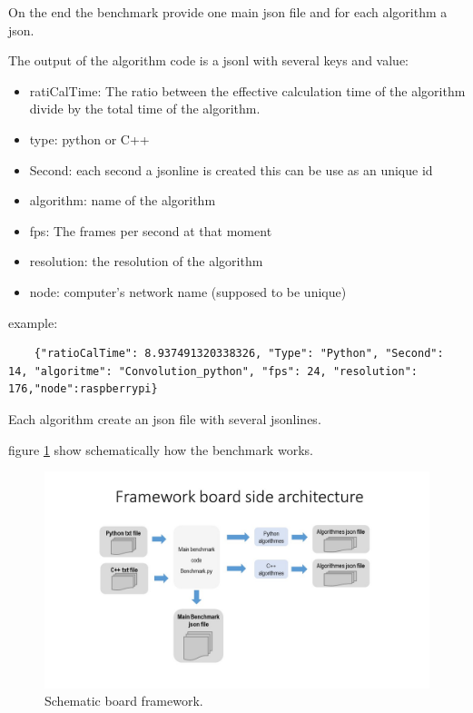 \documentclass[english]{book_template} %
\begin{document}
On the end the benchmark provide one main json file and for each algorithm a json. 

The output of the algorithm code is a jsonl with several keys and value:
\begin{itemize}
\item ratiCalTime: The ratio between the effective calculation time of the algorithm divide by the total time of the algorithm.
\item type: python or C++
\item Second: each second a jsonline is created this can be use as an unique id
\item algorithm: name of the algorithm
\item fps: The frames per second at that moment
\item resolution: the resolution of the algorithm
\item node: computer’s network name (supposed to be unique)
\end{itemize}

example: 
	\begin{lstlisting}
	{"ratioCalTime": 8.937491320338326, "Type": "Python", "Second": 14, "algoritme": "Convolution_python", "fps": 24, "resolution": 176,"node":raspberrypi}
	\end{lstlisting}
   
Each algorithm create an json file with several jsonlines. 

figure \ref{fig:board Arch} show schematically how the benchmark works.

\begin{figure}[H]
\center
\caption{Schematic board framework.\label{fig:board Arch}}
\includegraphics[scale=0.55]{./img/boardArch.jpg}
\end{figure}

 
\end{document}

